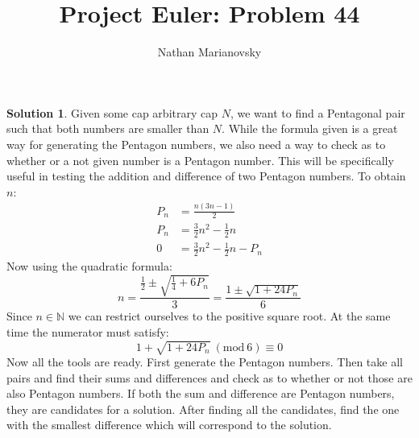 \documentclass[12pt, letterpaper, onecolumn, conference, final]{IEEEtran}
\title{Project Euler: Problem 44}
\author{Nathan Marianovsky}
\newcommand{\Mod}[1]{\ (\text{mod}\ #1)}
\theoremstyle{definition}
\newtheorem*{problem*}{Problem}
\newtheorem*{solution*}{Solution}
\theoremstyle{plain}
\begin{document}
\maketitle

\begin{center}
\end{center}

\vspace{.3cm}
\begin{solution*}
Given some cap arbitrary cap $N$, we want to find a Pentagonal pair such that both numbers are smaller than $N$. While the formula given is a great way for generating the Pentagon numbers, we also need a way to check as to whether or a not given number is a Pentagon number. This will be specifically useful in testing the addition and difference of two Pentagon numbers. To obtain $n$:
\begin{equation*}
\begin{split}
P_n &= \frac{n(3n-1)}{2} \\
P_n &= \frac{3}{2}n^2 - \frac{1}{2}n \\
0 &= \frac{3}{2}n^2 - \frac{1}{2}n - P_n
\end{split}
\end{equation*}
Now using the quadratic formula:
\begin{equation*}
n = \frac{\frac{1}{2} \pm \sqrt{\frac{1}{4} + 6P_n}}{3} = \frac{1 \pm \sqrt{1 + 24P_n}}{6}
\end{equation*}
Since $n \in \mathbb{N}$ we can restrict ourselves to the positive square root. At the same time the numerator must satisfy:
\begin{equation*}
1 + \sqrt{1 + 24P_n} \Mod 6 \equiv 0
\end{equation*}
Now all the tools are ready. First generate the Pentagon numbers. Then take all pairs and find their sums and differences and check as to whether or not those are also Pentagon numbers. If both the sum and difference are Pentagon numbers, they are candidates for a solution. After finding all the candidates, find the one with the smallest difference which will correspond to the solution.
\end{solution*}
\end{document}

